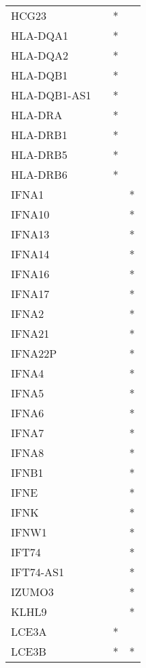 \begin{longtable}{lccc}
HCG23        &       &  * &         \\
HLA-DQA1     &       &  * &         \\
HLA-DQA2     &       &  * &         \\
HLA-DQB1     &       &  * &         \\
HLA-DQB1-AS1 &       &  * &         \\
HLA-DRA      &       &  * &         \\
HLA-DRB1     &       &  * &         \\
HLA-DRB5     &       &  * &         \\
HLA-DRB6     &       &  * &         \\
IFNA1        &       &    &       * \\
IFNA10       &       &    &       * \\
IFNA13       &       &    &       * \\
IFNA14       &       &    &       * \\
IFNA16       &       &    &       * \\
IFNA17       &       &    &       * \\
IFNA2        &       &    &       * \\
IFNA21       &       &    &       * \\
IFNA22P      &       &    &       * \\
IFNA4        &       &    &       * \\
IFNA5        &       &    &       * \\
IFNA6        &       &    &       * \\
IFNA7        &       &    &       * \\
IFNA8        &       &    &       * \\
IFNB1        &       &    &       * \\
IFNE         &       &    &       * \\
IFNK         &       &    &       * \\
IFNW1        &       &    &       * \\
IFT74        &       &    &       * \\
IFT74-AS1    &       &    &       * \\
IZUMO3       &       &    &       * \\
KLHL9        &       &    &       * \\
LCE3A        &       &  * &         \\
LCE3B        &       &  * &       * \\

\end{longtable}
